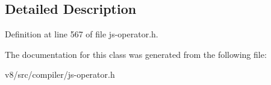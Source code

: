 \subsection{Detailed Description}


Definition at line 567 of file js-\/operator.\+h.



The documentation for this class was generated from the following file\+:\begin{DoxyCompactItemize}
\item 
v8/src/compiler/js-\/operator.\+h\end{DoxyCompactItemize}
